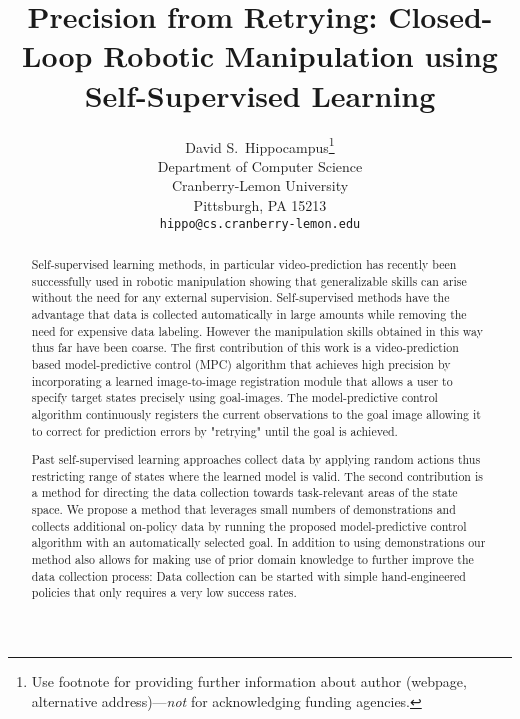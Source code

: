 \documentclass{article}
\title{Precision from Retrying: Closed-Loop Robotic Manipulation using Self-Supervised Learning}
\author{
  David S.~Hippocampus\thanks{Use footnote for providing further
    information about author (webpage, alternative
    address)---\emph{not} for acknowledging funding agencies.} \\
  Department of Computer Science\\
  Cranberry-Lemon University\\
  Pittsburgh, PA 15213 \\
  \texttt{hippo@cs.cranberry-lemon.edu} \\
}
\begin{document}

\maketitle

\begin{abstract}
Self-supervised learning methods, in particular video-prediction has recently been successfully used in robotic manipulation showing that generalizable skills can arise without the need for any external supervision.
Self-supervised methods have the advantage that data is collected automatically in large amounts while removing the need for expensive data labeling. However the manipulation skills obtained in this way thus far have been coarse.
The first contribution of this work is a video-prediction based model-predictive control (MPC)
algorithm that achieves high precision by incorporating a learned image-to-image registration module that allows a user to specify target states precisely using goal-images. The model-predictive control algorithm continuously registers the current observations to the goal image allowing it to correct for prediction errors by "retrying" until the goal is achieved. 

Past self-supervised learning approaches collect data by applying random actions thus restricting range of states where the learned model is valid. The second contribution is a method for directing the data collection towards task-relevant areas of the state space. We propose a method that leverages small numbers of demonstrations and collects additional on-policy data by running the proposed model-predictive control algorithm with an automatically selected goal. In addition to using demonstrations our method also allows for making use of prior domain knowledge to further improve the data collection process: Data collection can be started with simple hand-engineered policies that only requires a very low success rates.
\end{abstract}
\end{document}
